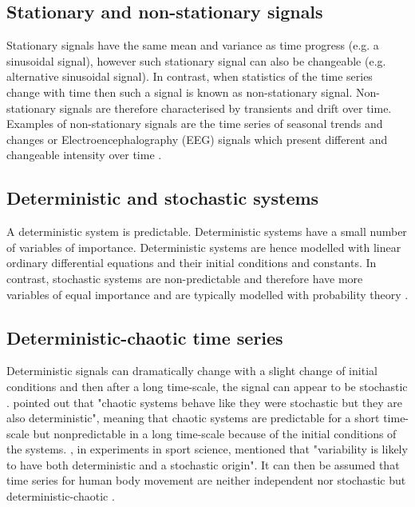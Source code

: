 \subsection{Stationary and non-stationary signals}
Stationary signals have the same mean and variance as time progress (e.g. 
a sinusoidal signal), however such stationary signal can also be changeable
(e.g. alternative sinusoidal signal).
In contrast, when statistics of the time series change with time then 
such a signal is known as non-stationary signal.
Non-stationary signals are therefore characterised by transients and 
drift over time. Examples of non-stationary signals are the time series of 
seasonal trends and changes \citep{kitagawa1984} or Electroencephalography (EEG) 
signals which present different and changeable intensity over time 
\citep{klonowski2007}.

\subsection{Deterministic and stochastic systems}
A deterministic system is predictable. Deterministic systems 
have a small number of variables of importance. 
Deterministic systems are hence modelled with linear ordinary 
differential equations and their initial conditions and constants.
In contrast, stochastic systems are non-predictable and therefore have 
more variables of equal importance and are typically  
modelled with probability theory \citep{klonowski2007}.

\subsection{Deterministic-chaotic time series}
Deterministic signals can dramatically change with a slight change 
of initial conditions and then after a long time-scale, the signal can 
appear to be stochastic \citep{amato1992}.
\citealt[p. 11]{klonowski2007} pointed out that "chaotic systems behave 
like they were stochastic but they are also deterministic", meaning that 
chaotic systems are predictable for a short time-scale but nonpredictable 
in a long time-scale because of the initial conditions of the systems. 
\citealt[p. 78]{preatoni2013}, in experiments in sport science, mentioned 
that "variability is likely to have both deterministic and a 
stochastic origin". It can then be assumed that time series for 
human body movement are neither independent nor stochastic but 
deterministic-chaotic \citep{stergiou2006, harbourne2009, stergiou2011}.

